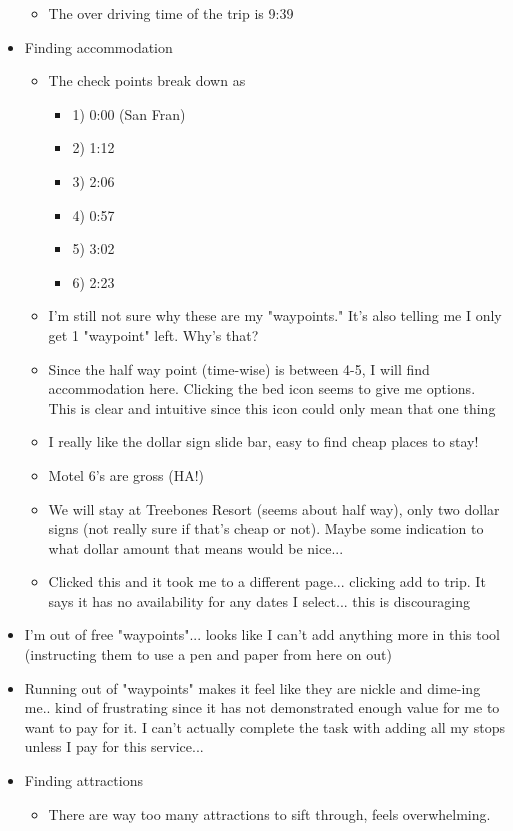 \begin{itemize}
\begin{itemize}
  \item The over driving time of the trip is 9:39
  \end{itemize}
\item Finding accommodation
  \begin{itemize}
  \item The check points break down as
    \begin{itemize}
    \item 1) 0:00 (San Fran)
    \item 2) 1:12
    \item 3) 2:06
    \item 4) 0:57
    \item 5) 3:02
    \item 6) 2:23
    \end{itemize}
  \item I'm still not sure why these are my "waypoints." It's also telling me I only get 1 "waypoint" left. Why's that?
  \item Since the half way point (time-wise) is between 4-5, I will find accommodation here. Clicking the bed icon seems to give me options. This is clear and intuitive since this icon could only mean that one thing
  \item I really like the dollar sign slide bar, easy to find cheap places to stay!
  \item Motel 6's are gross (HA!)
  \item We will stay at Treebones Resort (seems about half way), only two dollar signs (not really sure if that's cheap or not). Maybe some indication to what dollar amount that means would be nice...
  \item Clicked this and it took me to a different page... clicking add to trip. It says it has no availability for any dates I select... this is discouraging
  \end{itemize}
\item I'm out of free "waypoints"... looks like I can't add anything more in this tool (instructing them to use a pen and paper from here on out)
\item Running out of "waypoints" makes it feel like they are nickle and dime-ing me.. kind of frustrating since it has not demonstrated enough value for me to want to pay for it. I can't actually complete the task with adding all my stops unless I pay for this service...
\item Finding attractions
  \begin{itemize}
  \item There are way too many attractions to sift through, feels overwhelming.

\end{itemize}
\end{itemize}
